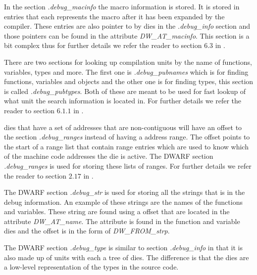 In the section \emph{.debug\_macinfo} the macro information is stored.
It is stored in entries that each represents the macro after it has been expanded by the compiler.
These entries are also pointer to by \glspl{die} in the \emph{.debug\_info} section and those pointers can be found in the attribute \emph{DW\_AT\_macinfo}.
This section is a bit complex thus for further details we refer the reader to section $6.3$ in \cite{dwarf}.


There are two sections for looking up compilation units by the name of functions, variables, types and more.
The first one is \emph{.debug\_pubnames} which is for finding functions, variables and objects and the other one is for finding types, this section is called \emph{.debug\_pubtypes}.
Both of these are meant to be used for fast lookup of what unit the search information is located in.
For further details we refer the reader to section $6.1.1$ in \cite{dwarf}.


\Glspl{die} that have a set of addresses that are non-contiguous will have an offset to the section \emph{.debug\_ranges} instead of having a address range.
The offset points to the start of a range list that contain range entries which are used to know which of the machine code addresses the \gls{die} is active.
The \gls{DWARF} section \emph{.debug\_ranges} is used for storing these lists of ranges.
For further details we refer the reader to section $2.17$ in \cite{dwarf}.


The \gls{DWARF} section \emph{.debug\_str} is used for storing all the strings that is in the debug information.
An example of these strings are the names of the functions and variables.
These string are found using a offset that are located in the attribute \emph{DW\_AT\_name}.
The attribute is found in the function and variable \glspl{die} and the offset is in the form of \emph{DW\_FROM\_strp}.


The \gls{DWARF} section \emph{.debug\_type} is similar to section \emph{.debug\_info} in that it is also made up of units with each a tree of \glspl{die}.
The difference is that the \glspl{die} are a low-level representation of the types in the source code.

